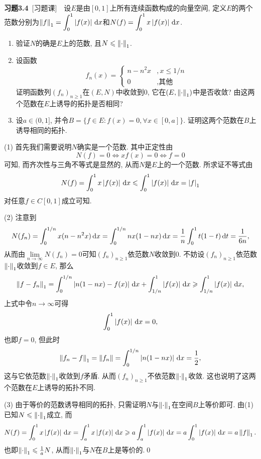 	\textbf{习题3.4}\ [习题课]\ \ 设$ E $是由$ [0,1] $上所有连续函数构成的向量空间, 定义$ E $的两个范数分别为$ \left\| f \right\|_1=\displaystyle\int_0^1\left| f(x) \right| \,\mathrm{d} x $和$ N(f)=\displaystyle\int_0^1x\left| f(x) \right| \,\mathrm{d} x $.
	\begin{enumerate}[(1)]
	\item 验证$ N $的确是$ E $上的范数, 且$ N\leqslant\left\| \cdot \right\|_1 $.
	\item 设函数
	\[
	f_n(x)=\begin{cases}
	n-n^2x & ,x\leqslant 1/n\\
	0 & ,\text{其他}
	\end{cases}
	\]
	证明函数列$ (f_n)_{n\geqslant 1} $在$ (E,N) $中收敛到0, 它在$ (E,\left\| \cdot \right\|_1) $中是否收敛? 由这两个范数在$ E $上诱导的拓扑是否相同?
	\item 设$ a\in(0,1] $, 并令$ B=\{ f\in E : f(x)=0, \forall x\in[0,a] \} $. 证明这两个范数在$ B $上诱导相同的拓扑.
	\end{enumerate}
	
	\begin{Proof}
	(1) 首先我们需要说明$ N $确实是一个范数. 其中正定性由
	\[
	N(f)=0\Longleftrightarrow xf(x)=0\Longleftrightarrow f=0
	\]
	可知, 而齐次性与三角不等式是显然的, 从而$ N $是$ E $上的一个范数. 所求证不等式由
	\[
	N(f)=\int_0^1x\left| f(x) \right| \,\mathrm{d} x\leqslant\int_0^1\left| f(x) \right| \,\mathrm{d} x=\left| f \right| _1
	\]
	对任意$ f\in C[0,1] $成立可知.
	
	(2) 注意到
	\[
	N(f_n)=\int_0^{1/n}x(n-n^2x)\,\mathrm{d} x=\int_0^{1/n}nx(1-nx)\,\mathrm{d} x=\frac{1}{n}\int_0^1t(1-t)\,\mathrm{d} t=\frac{1}{6n},
	\]
	从而由$ \lim\limits_{n\to\infty}N(f_n)=0 $可知$ (f_n)_{n\geqslant 1} $依范数$ N $收敛到0. 不妨设$ (f_n)_{n\geqslant 1} $依范数$ \left\| \cdot \right\|_1 $收敛到$ f\in E $, 那么
	\[
	\left\| f-f_n \right\|_1=\int_0^{1/n}\left| n(1-nx)-f(x) \right| \,\mathrm{d} x+\int_{1/n}^1\left| f(x) \right| \,\mathrm{d} x\geqslant\int_{1/n}^1\left| f(x) \right| \,\mathrm{d} x,
	\]
	上式中令$ n\to\infty $可得
	\[
	\int_0^1\left| f(x) \right| \,\mathrm{d} x=0,
	\]
	也即$ f=0 $, 但此时
	\[
	\left\| f_n-f \right\|_1=\left\| f_n \right\|=\int_0^{1/n}\left| n(1-nx) \right| \,\mathrm{d} x=\frac{1}{2},
	\]
	这与它依范数$ \left\| \cdot \right\|_1 $收敛到$ f $矛盾. 从而$ (f_n)_{n\geqslant 1} $不依范数$ \left\| \cdot \right\|_1 $收敛. 这也说明了这两个范数在$ E $上诱导的拓扑不同.
	
	(3) 由于等价的范数诱导相同的拓扑, 只需证明$ N $与$ \left\| \cdot \right\|_1 $在空间$ B $上等价即可. 由(1)已知$ N\leqslant\left\| \cdot \right\|_1 $成立, 而
	\[
	N(f)=\int_0^1x\left| f(x) \right| \,\mathrm{d} x=\int_a^1x\left| f(x) \right| \,\mathrm{d} x\geqslant a\int_a^1\left| f(x) \right| \,\mathrm{d} x=a\int_0^1\left| f(x) \right| \,\mathrm{d} x=a\left\| f \right\|_1.
	\]
	也即$ \left\| \cdot \right\|_1\leqslant\frac{1}{a}N $, 从而$ \left\| \cdot \right\|_1 $与$ N $在$ B $上是等价的.\qed
	\end{Proof}
	
